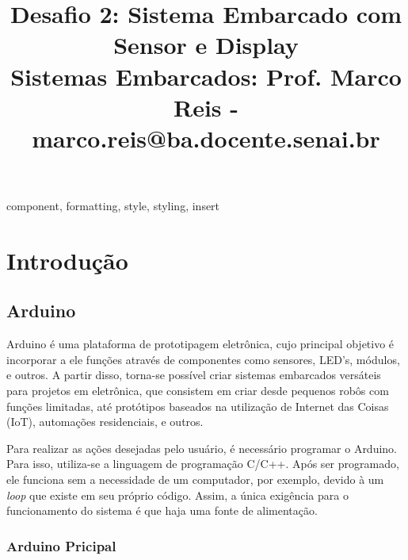 \documentclass[conference]{IEEEtran}
\begin{document}
\title{Desafio 2: Sistema Embarcado com Sensor e Display\\
{\footnotesize Sistemas Embarcados: Prof. Marco Reis - marco.reis@ba.docente.senai.br}
}

\author{
}

\maketitle

\begin{abstract}

\end{abstract}
    
\begin{IEEEkeywords}
    component, formatting, style, styling, insert
\end{IEEEkeywords}
    
\section{Introdução}
\subsection{Arduino}

    Arduino é uma plataforma de prototipagem eletrônica, cujo principal objetivo é incorporar a ele 
funções através de componentes como sensores, LED's, módulos, e outros. A partir disso, torna-se 
possível criar sistemas embarcados versáteis para projetos em eletrônica, que consistem em criar desde 
pequenos robôs com funções limitadas, até protótipos baseados na utilização de Internet das Coisas (IoT),
automações residenciais, e outros.

    Para realizar as ações desejadas pelo usuário, é necessário programar o Arduino. Para isso, utiliza-se 
a linguagem de programação C/C++. Após ser programado, ele funciona sem a necessidade de um computador, por
exemplo, devido à um \emph{loop} que existe em seu próprio código. Assim, a única exigência para o
funcionamento do sistema é que haja uma fonte de alimentação.

\subsubsection{Arduino Pricipal}
\end{document}
